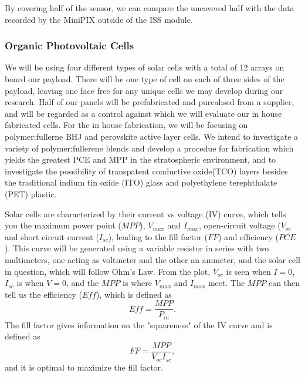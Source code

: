{By covering half of the sensor, we can compare the uncovered half with the data recorded by the MiniPIX outside of the ISS module.

\subsubsection{Organic Photovoltaic Cells}    
We will be using four different types of solar cells with a total of 12 arrays on board our payload. There will be one type of cell on each of three sides of the payload, leaving one face free for any unique cells we may develop during our research. Half of our panels will be prefabricated and purcahsed from a supplier, and will be regarded as a control against which we will evaluate our in house fabricated cells. For the in house fabrication, we will be focusing on polymer:fullerne BHJ and perovskite active layer cells. We intend to investigate a variety of polymer:fullerene blends and develop a procedue for fabrication which yields the greatest PCE and MPP in the stratospheric environment, and to investigate the possibility of transpatent conductive oxide(TCO) layers besides the traditional indium tin oxide (ITO) glass and polyethylene terephthalate (PET) plastic. \cite{nextgen_TCO}

Solar cells are characterized by their current vs voltage (IV) curve, which tells you the maximum power point ($MPP$), $V_{max}$ and $I_{max}$, open-circuit voltage ($V_{oc}$ and short circuit current ($I_{sc}$), leading to the fill factor ($FF$) and efficiency ($PCE$). This curve will be  generated using a variable resistor in series with two multimeters, one acting as voltmeter and the other an ammeter, and the solar cell in question, which will follow Ohm's Law. From the plot, $V_{oc}$ is seen when $I=0$, $I_{sc}$ is when $V = 0$, and the $MPP$ is where $V_{max}$ and $I_{max}$ meet. The $MPP$ can then tell us the efficiency ($Eff$), which is defined as
\begin{equation}
  Eff = \dfrac{MPP}{P_{in}}.
\end{equation}
The fill factor gives information on the "squareness" of the IV curve and is defined as
\begin{equation}
  FF = \dfrac{MPP}{V_{oc}I_{sc}},
\end{equation}
and it is optimal to maximize the fill factor. \cite{OPV_operation}

}
